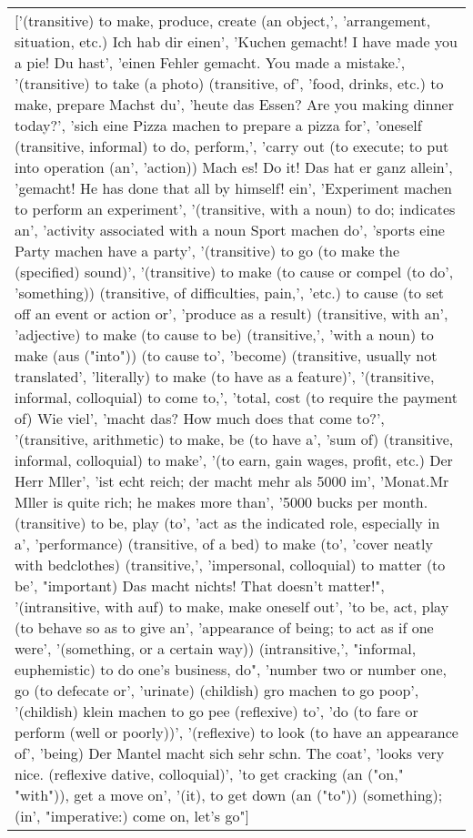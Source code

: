 \documentclass[a4paper,backgrid,frontgrid]{flacards}
\begin{document}
{\begin{tabular}{l}
\parbox[t][][t]{8cm}{\normalfont \small ['(transitive) to make, produce, create (an object,', 'arrangement, situation, etc.) Ich hab dir einen', 'Kuchen gemacht!  I have made you a pie! Du hast', 'einen Fehler gemacht.  You made a mistake.', '(transitive) to take (a photo) (transitive, of', 'food, drinks, etc.) to make, prepare Machst du', 'heute das Essen?  Are you making dinner today?', 'sich eine Pizza machen  to prepare a pizza for', 'oneself (transitive, informal) to do, perform,', 'carry out (to execute; to put into operation (an', 'action)) Mach es!  Do it! Das hat er ganz allein', 'gemacht!  He has done that all by himself! ein', 'Experiment machen  to perform an experiment', '(transitive, with a noun) to do; indicates an', 'activity associated with a noun Sport machen  do', 'sports eine Party machen  have a party', '(transitive) to go (to make the (specified) sound)', '(transitive) to make (to cause or compel (to do', 'something)) (transitive, of difficulties, pain,', 'etc.) to cause (to set off an event or action or', 'produce as a result) (transitive, with an', 'adjective) to make (to cause to be) (transitive,', 'with a noun) to make (aus ("into")) (to cause to', 'become) (transitive, usually not translated', 'literally) to make (to have as a feature)', '(transitive, informal, colloquial) to come to,', 'total, cost (to require the payment of) Wie viel', 'macht das?  How much does that come to?', '(transitive, arithmetic) to make, be (to have a', 'sum of) (transitive, informal, colloquial) to make', '(to earn, gain wages, profit, etc.) Der Herr Mller', 'ist echt reich; der macht mehr als 5000 im', 'Monat.Mr Mller is quite rich; he makes more than', '5000 bucks per month. (transitive) to be, play (to', 'act as the indicated role, especially in a', 'performance) (transitive, of a bed) to make (to', 'cover neatly with bedclothes) (transitive,', 'impersonal, colloquial) to matter (to be', "important) Das macht nichts!  That doesn't matter!", '(intransitive, with auf) to make, make oneself out', 'to be, act, play (to behave so as to give an', 'appearance of being; to act as if one were', '(something, or a certain way)) (intransitive,', "informal, euphemistic) to do one's business, do", 'number two or number one, go (to defecate or', 'urinate) (childish) gro machen  to go poop', '(childish) klein machen  to go pee (reflexive) to', 'do (to fare or perform (well or poorly))', '(reflexive) to look (to have an appearance of', 'being) Der Mantel macht sich sehr schn.  The coat', 'looks very nice. (reflexive  dative, colloquial)', 'to get cracking (an ("on," "with")), get a move on', '(it), to get down (an ("to")) (something); (in', "imperative:) come on, let's go"] }\\
\end{tabular}
}
\end{document}
